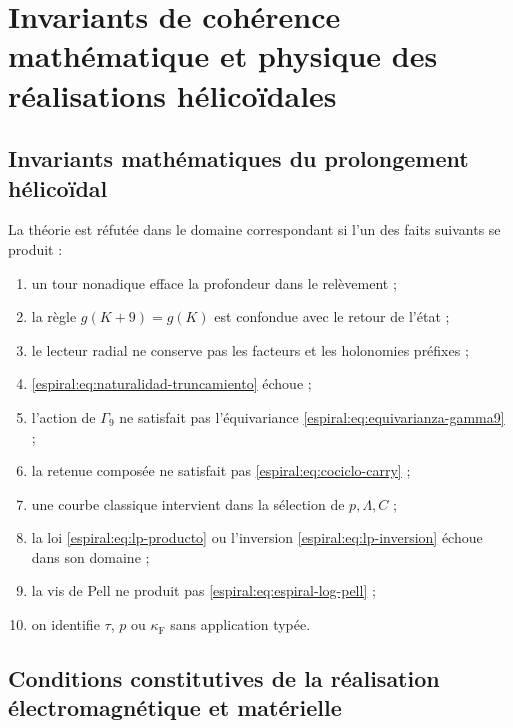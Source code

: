 \chapter{Invariants de cohérence mathématique et physique des réalisations hélicoïdales}

\section{Invariants mathématiques du prolongement hélicoïdal}

La théorie est réfutée dans le domaine correspondant si l'un des faits suivants se produit :
\begin{enumerate}
\item un tour nonadique efface la profondeur dans le relèvement ;
\item la règle \(g(K+9)=g(K)\) est confondue avec le retour de l'état ;
\item le lecteur radial ne conserve pas les facteurs et les holonomies préfixes ;
\item \cref{espiral:eq:naturalidad-truncamiento} échoue ;
\item l'action de \(\Gamma_9\) ne satisfait pas l'équivariance \cref{espiral:eq:equivarianza-gamma9} ;
\item la retenue composée ne satisfait pas \cref{espiral:eq:cociclo-carry} ;
\item une courbe classique intervient dans la sélection de \(p,\Lambda,C\) ;
\item la loi \cref{espiral:eq:lp-producto} ou l'inversion \cref{espiral:eq:lp-inversion} échoue dans son domaine ;
\item la vis de Pell ne produit pas \cref{espiral:eq:espiral-log-pell} ;
\item on identifie \(\tau\), \(p\) ou \(\kappa_{\mathrm{F}}\) sans application typée.
\end{enumerate}

\section{Conditions constitutives de la réalisation électromagnétique et matérielle}

